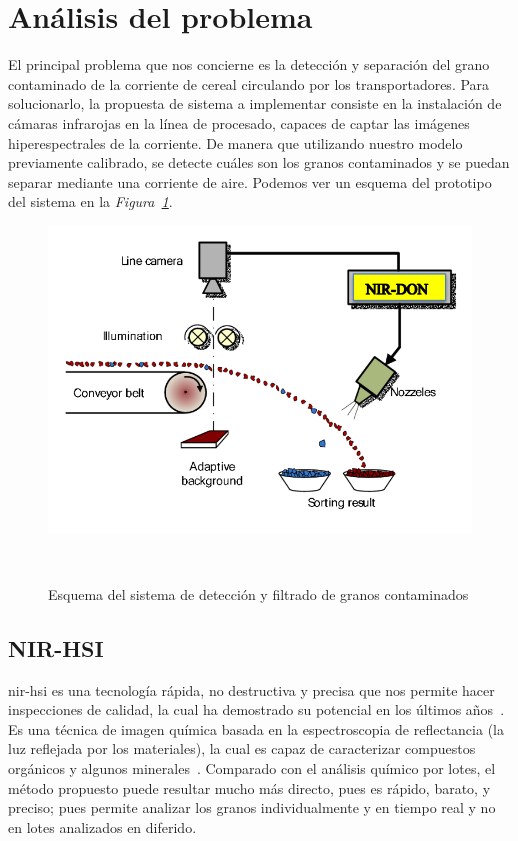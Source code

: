 \section{Análisis del problema}\label{sec:analisis}

El principal problema que nos concierne es la detección y separación del grano contaminado de la corriente de cereal circulando por los transportadores. Para solucionarlo,
la propuesta de sistema a implementar consiste en la instalación de cámaras infrarojas en la línea de procesado, capaces de captar las imágenes hiperespectrales de la
corriente. De manera que utilizando nuestro modelo previamente calibrado, se detecte cuáles son los granos contaminados y se puedan separar mediante una corriente de aire. 
Podemos ver un esquema del prototipo del sistema en la \textit{Figura\ \ref{fig:detection-system}}.

\begin{figure}[!h]
    \centering
    \includegraphics[width=0.7\linewidth]{media/images/esquema-del-sistema.png}
    \caption{Esquema del sistema de detección y filtrado de granos contaminados}\ \label{fig:detection-system}
\end{figure}


\subsection{NIR-HSI}


\gls{nir-hsi} es una tecnología rápida, no destructiva y precisa que nos permite hacer inspecciones de calidad, la cual ha demostrado su potencial en los últimos años\ \cite{Applicat5:online}. 
Es una técnica de imagen química basada en la espectroscopia de reflectancia (la luz reflejada por los materiales), la cual es capaz de caracterizar compuestos orgánicos y algunos minerales\ \cite{NIRHyper23:online}. Comparado con el análisis químico por lotes, el método propuesto puede resultar mucho más directo, pues es rápido, barato, y preciso; pues permite analizar los granos individualmente y en tiempo real y no en lotes analizados en diferido.

